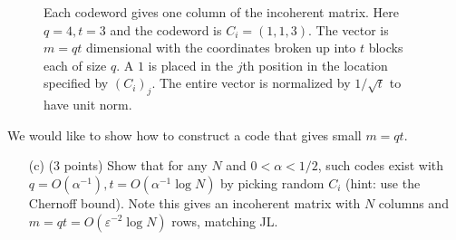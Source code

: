 \documentclass[12pt]{article}
\newcommand{\eps}{\varepsilon}
\begin{document}
\begin{figure}[!h]
\begin{center}
\caption{Each codeword gives one column of the incoherent matrix. Here $q = 4, t = 3$ and the codeword is $C_i = (1,1,3)$. The vector is $m = qt$ dimensional with the coordinates broken up into $t$ blocks each of size $q$. A $1$ is placed in the $j$th position in the location specified by $(C_i)_j$. The entire vector is normalized by $1/\sqrt{t}$ to have unit norm.}\label{fig:codes}
\end{center}
\end{figure}

We would like to show how to construct a code that gives small $m=qt$.

\begin{itemize}
\item[(c)] (3 points) Show that for any $N$ and $0<\alpha<1/2$, such codes exist with $q = O(\alpha^{-1}), t = O(\alpha^{-1}\log N)$ by picking random $C_i$ (hint: use the Chernoff bound). Note this gives an incoherent matrix with $N$ columns and $m = qt = O(\eps^{-2}\log N)$ rows, matching JL.
\end{itemize}
\end{document}
